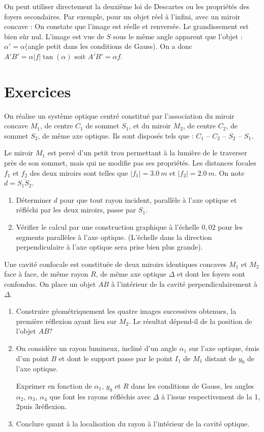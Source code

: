 On peut utiliser directement la deuxième loi de Descartes ou les propriétés des foyers secondaires. Par exemple, pour un objet réel à l'infini, avec un miroir concave : On constate que l'image est réelle et renversée. Le grandissement est bien sûr nul. L'image est vue de $S$ sous le même angle apparent que l'objet : $\alpha'=\alpha$(angle petit dans les conditions de Gauss). On a donc $A'B' = \alpha |f| \tan(\alpha)$  soit $\overline{A'B'} = \alpha f$.

\section{Exercices}
\label{chap7-sec:exercices}

\begin{exercice}
  On réalise un système optique centré constitué par l'association du miroir concave $M_1$, de centre $C_1$ de sommet $S_1$, et du miroir $M_2$, de centre $C_2$, de sommet $S_2$, de même axe optique. Ils sont disposés tels que : 
$C_1$ -- $C_2$ -- $S_2$ -- $S_1$.

Le miroir $M_1$ est percé d'un petit trou permettant à la lumière de le traverser près de son sommet, mais qui ne modifie pas ses propriétés.
Les distances focales $f_1$ et $f_2$ des deux miroirs sont telles que $|f_1| = \SI{3.0}{m}$ et $|f_2| = \SI{2.0}{m}$. On note $d = \overline{S_1 S_2}$.
\begin{enumerate}
\item Déterminer $d$ pour que tout rayon incident, parallèle à l'axe optique et réfléchi par les deux miroirs, passe par $S_1$.
\item Vérifier le calcul par une construction graphique à l'échelle $0,02$ pour les segments parallèles à l'axe optique. (L'échelle dans la direction perpendiculaire à l'axe optique sera prise bien plus grande).
\end{enumerate}
\end{exercice}
%
\begin{exercice}
  Une cavité confocale est constituée de deux miroirs identiques concaves $M_1$ et $M_2$ face à face, de même rayon $R$, de même axe optique $\Delta$ et dont les foyers sont confondus. On place un objet $AB$ à l'intérieur de la cavité perpendiculairement à $\Delta$.
%
  \begin{enumerate}
  \item Construire géométriquement les quatre images successives obtenues, la première réflexion ayant lieu sur $M_2$. Le résultat dépend-il de la position de l'objet $AB$?
  \item On considère un rayon lumineux, incliné d'un angle $\alpha_1$ sur l'axe optique, émis d'un point $B$ et dont le support passe par le point $I_1$ de $M_1$ distant de $y_0$ de l'axe optique.

    Exprimer en fonction de $\alpha_1$, $y_0$ et $R$ dans les conditions de Gauss, les angles $\alpha_2$, $\alpha_3$, $\alpha_4$ que font les rayons réfléchis avec $\Delta$ à l'issue respectivement de la 1\iere, 2\ieme puis 3\ieme réflexion.
  \item Conclure quant à la localisation du rayon à l'intérieur de la cavité optique.
  \end{enumerate}
\end{exercice}
